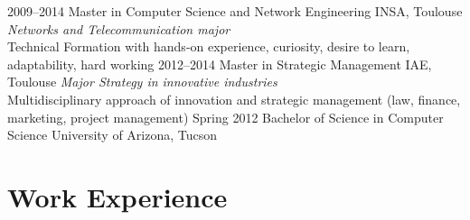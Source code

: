 \documentclass[]{friggeri-cv} %
\begin{document}
\begin{entrylist}
\entry
{2009--2014}
{Master {\normalfont in Computer Science and Network Engineering}}
{INSA, Toulouse}
{\emph{Networks and Telecommunication major}\\
Technical Formation with hands-on experience, curiosity, desire to learn, adaptability, hard working
\vspace{.2cm}}
\entry
{2012--2014}
{Master {\normalfont in Strategic Management}}
{IAE, Toulouse}
{\emph{Major Strategy in innovative industries}\\
Multidisciplinary approach of innovation and strategic management (law, finance, marketing, project management)
\vspace{-.2cm}}
\entry
{Spring 2012}
{Bachelor of Science {\normalfont in Computer Science}}
{University of Arizona, Tucson}
{\vspace{-10pt}}
\end{entrylist}


\section{Work Experience}
\end{document}
